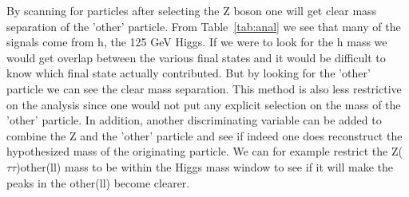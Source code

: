 


By scanning for particles after selecting the Z boson one will get clear mass separation of the 'other' particle.  From Table~\ref{tab:anal} we see that many of the signals come from h, the 125 GeV Higgs.  If we were to look for the h mass we would get overlap between the various final states and it would be difficult to know which final
state actually contributed.  But by looking for the 'other' particle we can see the clear mass separation.  This method is also less restrictive on the analysis since one would not put any explicit selection on the mass
of the 'other' particle. In addition, another discriminating variable can be added to combine the Z and the 'other' particle and see if indeed one does reconstruct the hypothesized mass of the originating particle.  We can for example restrict the Z($\tau\tau$)other(ll) mass to be within the Higgs mass window to see if it will make the peaks in the other(ll) become clearer.  

